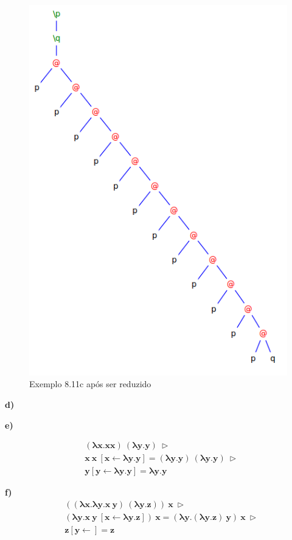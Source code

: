 \documentclass[a4paper]{article}
\begin{document}
\begin{figure}[h]
  \centering
  \includegraphics[scale=0.5]{8-11c_2.png}
  \caption{Exemplo 8.11c após ser reduzido}
\end{figure}

\FloatBarrier

\textbf{d)}


\FloatBarrier
\textbf{e)}

\begin{align*}
&\mathbf{(\lambda x.x x)\ (\lambda y.y)\ \rhd} \\
&\mathbf{x\ x\ [x \leftarrow \lambda y.y] = (\lambda y.y)\ (\lambda y.y)\ \rhd} \\
&\mathbf{y [y \leftarrow \lambda y.y] = \lambda y.y}
\end{align*}

\textbf{f)}
\begin{align*}
&\mathbf{((\lambda x.\lambda y.x\ y)\ (\lambda y.z))\ x\ \rhd} \\
&\mathbf{(\lambda y.x\ y\ [x \leftarrow \lambda y.z])\ x = (\lambda y.(\lambda y.z)\ y)\ x\ \rhd} \\
&\mathbf{z [y \leftarrow] = z}
\end{align*}
\end{document}
